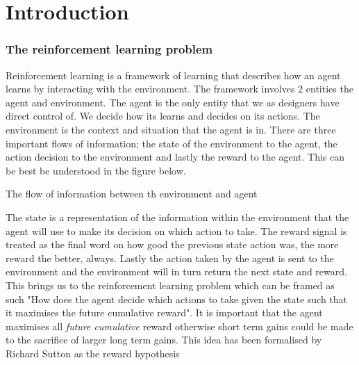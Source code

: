 \chapter{Introduction}\label{C:intro}

\subsection{The reinforcement learning problem}

Reinforcement learning is a framework of learning that describes how an agent learns by interacting with the environment. The framework involves 2 entities the agent and environment. The agent is the only entity that we as designers have direct control of. We decide how its learns and decides on its actions. The environment is the context and situation that the agent is in. There are three important flows of information;  the state of the environment to the agent, the action decision to the environment and lastly the reward to the agent. This can be best be understood in the figure below.

\begin{fig}
\begin{center}
    \caption{The flow of information between th environment and agent}
\end{center}
\end{fig}

The state is a representation of the information within the environment that the agent will use to make its decision on which action to take. The reward signal is treated as the final word on how good the previous state action was, the more reward the better, always. Lastly the action taken by the agent is sent to the environment and the environment will in turn return the next state and reward. This brings us to the reinforcement learning problem which can be framed as such "How does the agent decide which actions to take given the state such that it maximises the future cumulative reward". It is important that the agent maximises all \textit{future cumulative} reward otherwise short term gains could be made to the sacrifice of larger long term gains. This idea has been formalised by Richard Sutton as the reward hypothesis

